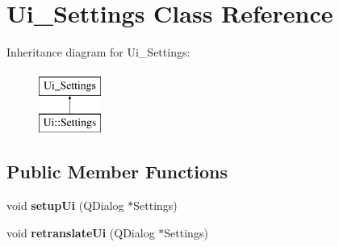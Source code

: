 \hypertarget{class_ui___settings}{}\section{Ui\+\_\+\+Settings Class Reference}
\label{class_ui___settings}
Inheritance diagram for Ui\+\_\+\+Settings\+:\begin{figure}[H]
\begin{center}
\leavevmode
\includegraphics[height=2.000000cm]{class_ui___settings}
\end{center}
\end{figure}
\subsection*{Public Member Functions}
\begin{DoxyCompactItemize}
\item 
\hypertarget{class_ui___settings_a90104a808baaa0a2edc93b900865f9c1}{}void {\bfseries setup\+Ui} (Q\+Dialog $\ast$Settings)\label{class_ui___settings_a90104a808baaa0a2edc93b900865f9c1}

\item 
\hypertarget{class_ui___settings_a4ffc6b32fd9a300853238c79a9d18aae}{}void {\bfseries retranslate\+Ui} (Q\+Dialog $\ast$Settings)\label{class_ui___settings_a4ffc6b32fd9a300853238c79a9d18aae}

\end{DoxyCompactItemize}
